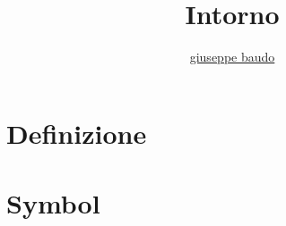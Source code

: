 \documentclass[a4paper,10pt]{article}
\title{Intorno}
\author{\href{http://www.baudo.hol.es}{giuseppe baudo}}
\begin{document}
\maketitle

\section{Definizione}


\section{Symbol}
\end{document}

